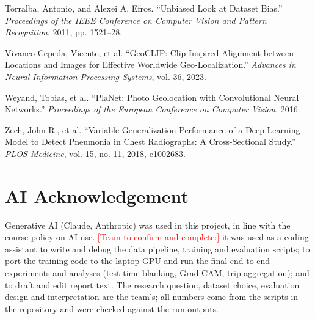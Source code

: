 \documentclass[clean,twocolumn]{bam-project}
\newcommand{\pending}[1]{\textcolor{red}{[#1]}}
\begin{document}
\begin{description}[leftmargin=2em,labelindent=0pt,font=\normalfont,itemsep=2pt]
\item Torralba, Antonio, and Alexei A. Efros. ``Unbiased Look at Dataset Bias.'' \emph{Proceedings of the IEEE Conference on Computer Vision and Pattern Recognition}, 2011, pp. 1521--28.
\item Vivanco Cepeda, Vicente, et al. ``GeoCLIP: Clip-Inspired Alignment between Locations and Images for Effective Worldwide Geo-Localization.'' \emph{Advances in Neural Information Processing Systems}, vol. 36, 2023.
\item Weyand, Tobias, et al. ``PlaNet: Photo Geolocation with Convolutional Neural Networks.'' \emph{Proceedings of the European Conference on Computer Vision}, 2016.
\item Zech, John R., et al. ``Variable Generalization Performance of a Deep Learning Model to Detect Pneumonia in Chest Radiographs: A Cross-Sectional Study.'' \emph{PLOS Medicine}, vol. 15, no. 11, 2018, e1002683.
\end{description}

\section*{AI Acknowledgement}
Generative AI (Claude, Anthropic) was used in this project, in line with the course policy on AI use.
\pending{Team to confirm and complete:} it was used as a coding assistant to write and debug the data
pipeline, training and evaluation scripts; to port the training code to the laptop GPU and run the
final end-to-end experiments and analyses (test-time blanking, Grad-CAM, trip aggregation); and to draft
and edit report text. The research question, dataset choice, evaluation design and interpretation are
the team's; all numbers come from the scripts in the repository and were checked against the run outputs.
\end{document}

